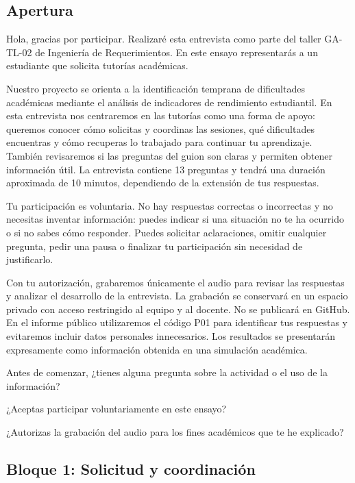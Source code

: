 \documentclass[11pt,a4paper]{article}
\begin{document}
\subsection{Apertura}

Hola, gracias por participar. Realizaré esta entrevista como parte del taller GA-TL-02
de Ingeniería de Requerimientos. En este ensayo representarás
a un estudiante que solicita tutorías académicas.

Nuestro proyecto se orienta a la identificación temprana de
dificultades académicas mediante el análisis de indicadores
de rendimiento estudiantil. En esta entrevista nos centraremos
en las tutorías como una forma de apoyo: queremos conocer
cómo solicitas y coordinas las sesiones, qué dificultades
encuentras y cómo recuperas lo trabajado para continuar
tu aprendizaje. También revisaremos si las preguntas
del guion son claras y permiten obtener información útil.
La entrevista contiene 13 preguntas y tendrá una duración
aproximada de 10 minutos, dependiendo de la extensión de tus
respuestas.

Tu participación es voluntaria. No hay respuestas correctas
o incorrectas y no necesitas inventar información: puedes indicar
si una situación no te ha ocurrido o si no sabes cómo responder.
Puedes solicitar aclaraciones, omitir cualquier pregunta, pedir
una pausa o finalizar tu participación sin necesidad de justificarlo.

Con tu autorización, grabaremos únicamente el audio para revisar
las respuestas y analizar el desarrollo de la entrevista.
La grabación se conservará en un espacio privado con acceso
restringido al equipo y al docente. No se publicará en GitHub.
En el informe público utilizaremos el código P01 para identificar
tus respuestas y evitaremos incluir datos personales innecesarios.
Los resultados se presentarán expresamente como información
obtenida en una simulación académica.

Antes de comenzar, ¿tienes alguna pregunta sobre la actividad
o el uso de la información?

¿Aceptas participar voluntariamente en este ensayo?

¿Autorizas la grabación del audio para los fines académicos
que te he explicado?

\subsection{Bloque 1: Solicitud y coordinación}
\end{document}
